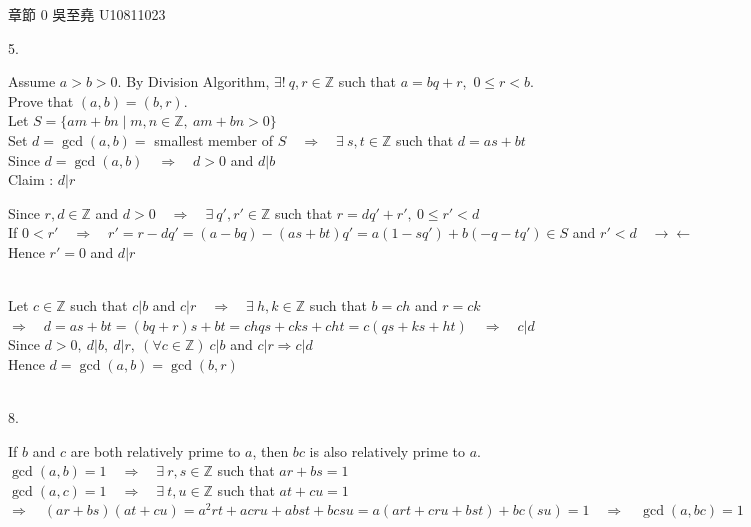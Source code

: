 \documentclass[12pt]{book}
\author{andersonwu2000}
\begin{document}
\begin{CJK}{UTF8}{bsmi}

\hfill 章節 0 吳至堯 U10811023


5. \begin{minipage}[t]{\dimexpr\linewidth-2em}
Assume $a>b>0$. By Division Algorithm, $\exists!\ q, r\in\mathbb{Z}$ such that $a=bq+r$,\ $0\le r<b$. \\
Prove that $(a, b)=(b, r)$. \\
Let $S=\{am+bn\mid m,n\in\mathbb{Z},\ am+bn>0\}$ \\
Set $d=\gcd(a,b)=$ smallest member of $S\quad\Rightarrow\quad\exists\ s,t\in\mathbb{Z}$ such that $d=as+bt$ \\
Since $d=\gcd(a, b)\quad\Rightarrow\quad d>0$ and $d|b$ \\
Claim : $d|r$ \\
\hspace*{2em}\begin{minipage}{\dimexpr\linewidth}
Since $r,d\in\mathbb{Z}$ and $d>0\quad\Rightarrow\quad\exists\ q', r'\in\mathbb{Z}$ such that $r=dq'+r',\ 0\le r'<d$ \\
If $0<r'\quad\Rightarrow\quad r'=r-dq'=(a-bq)-(as+bt)q'=a(1-sq')+b(-q-tq')\in S$ and $r'<d\quad\rightarrow\leftarrow$ \\
Hence $r'=0$ and $d|r$
\end{minipage} \\[5pt]
Let $c\in\mathbb{Z}$ such that $c|b$ and $c|r\quad\Rightarrow\quad\exists\ h, k\in\mathbb{Z}$ such that $b=ch$ and $r=ck$ \\
$\Rightarrow\quad d=as+bt=(bq+r)s+bt=chqs+cks+cht=c(qs+ks+ht)\quad\Rightarrow\quad c|d$ \\
Since $d>0,\ d|b,\ d|r,\ (\forall c\in\mathbb{Z})\ c|b$ and $c|r\Rightarrow c|d$ \\
Hence $d=\gcd(a, b)=\gcd(b, r)$
\end{minipage}\\

8. \begin{minipage}[t]{\dimexpr\linewidth-2em}
If $b$ and $c$ are both relatively prime to $a$, then $bc$ is also relatively prime to $a$. \\
$\gcd(a,b)=1\quad\Rightarrow\quad\exists\ r, s\in\mathbb{Z}$ such that $ar+bs=1$ \\
$\gcd(a,c)=1\quad\Rightarrow\quad\exists\ t, u\in\mathbb{Z}$ such that $at+cu=1$ \\
$\Rightarrow\quad (ar+bs)(at+cu)=a^2rt+acru+abst+bcsu=a(art+cru+bst)+bc(su)=1\quad\Rightarrow\quad \gcd(a, bc)=1$
\end{minipage}\\


\end{CJK}
\end{document}
